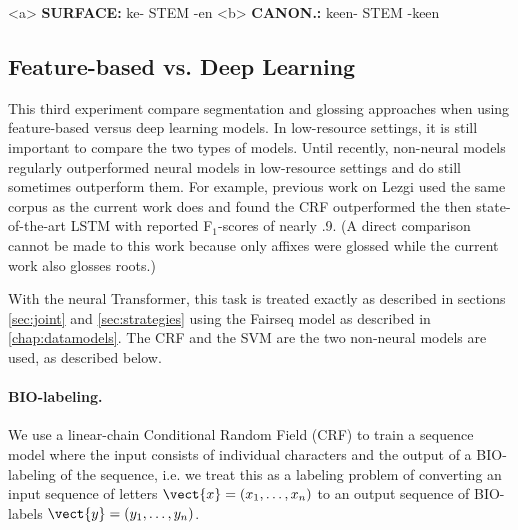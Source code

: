 \pex   
\label{ex:Circumfixes}
\a<a> \textbf{SURFACE:} \hspace{2 mm} ke- \hspace{4 mm}  STEM  \hspace{1 mm} -en
\label{ex:circumsurf}
\a<b> \textbf{CANON.:} \hspace{1 mm} ke\textlangle{}\textrangle{}en- \hspace{1 mm} STEM \hspace{1 mm} -ke\textlangle{}\textrangle{}en
\label{ex:circumcan}
\xe



\subsection{Feature-based vs. Deep Learning}
\label{sec:CRFvNN}

This third experiment compare segmentation and glossing approaches when using feature-based versus deep learning models. In low-resource settings, it is still important to compare the two types of models. Until recently, non-neural models regularly outperformed neural models in low-resource settings and do still sometimes outperform them. For example, previous work on Lezgi \citep{moeller_automatic_2018} used the same corpus as the current work does and found the CRF outperformed the then state-of-the-art LSTM with reported F$_1$-scores of nearly .9. (A direct comparison cannot be made to this work because only affixes were glossed while the current work also glosses roots.) 

With the neural Transformer, this task is treated exactly as described in sections \ref{sec:joint} and \ref{sec:strategies} using the Fairseq model as described in \ref{chap:datamodels}. The CRF and the SVM are the two non-neural models are used, as described below.

\paragraph{BIO-labeling.} 
We use a linear-chain Conditional Random Field (CRF) \cite{lafferty2001} to train a sequence model where the input consists of individual characters and the output of a BIO-labeling \cite{ramshaw1999} of the sequence, i.e. we treat this as a labeling problem of converting an input sequence of letters $\vect{x} = (x_1, \ldots, x_n)$ to an output sequence of BIO-labels $\vect{y} = (y_1, \ldots, y_n)$.

